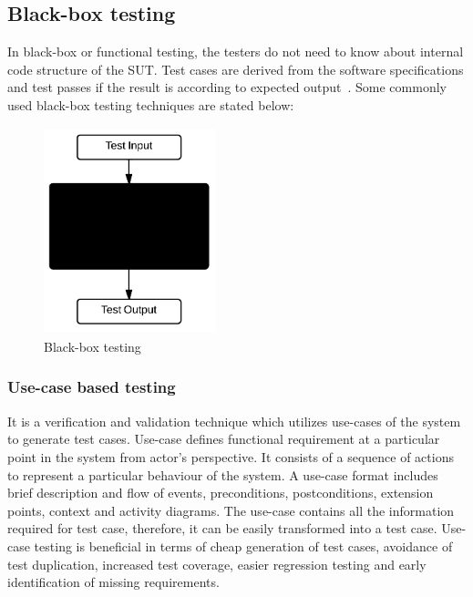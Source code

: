 \subsection{Black-box testing}
In black-box or functional testing, the testers do not need to know about internal code structure of the SUT. Test cases are derived from the software specifications and test passes if the result is according to expected output~\cite{beizer1995black}. Some commonly used black-box testing techniques are stated below:
\begin{figure}[h]
\begin{center}
	\includegraphics[width=5cm, height=6cm ]{chapter2/blackBox.png}
	\caption{Black-box testing}
 	\label{fig:blackBox}
\end{center}  
\end{figure}
\subsubsection{Use-case based testing}
It is a verification and validation technique which utilizes use-cases of the system to generate test cases. Use-case defines functional requirement at a particular point in the system from actor's perspective. It consists of a sequence of actions to represent a particular behaviour of the system. A use-case format includes brief description and flow of events, preconditions, postconditions, extension points, context and activity diagrams. The use-case contains all the information required for test case, therefore, it can be easily transformed into a test case. Use-case testing is beneficial in terms of cheap generation of test cases, avoidance of test duplication, increased test coverage, easier regression testing and early identification of missing requirements.  

